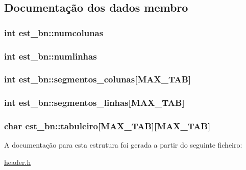 \subsection{Documentação dos dados membro}
\hypertarget{structest__bn_a0955bffd5d0a13407e1bb2657c296a24}{
\subsubsection[{numcolunas}]{\setlength{\rightskip}{0pt plus 5cm}int est\-\_\-bn\-::numcolunas}}\label{structest__bn_a0955bffd5d0a13407e1bb2657c296a24}
\hypertarget{structest__bn_af15be3a2b8dd97b2f754471aa655dc6f}{
\subsubsection[{numlinhas}]{\setlength{\rightskip}{0pt plus 5cm}int est\-\_\-bn\-::numlinhas}}\label{structest__bn_af15be3a2b8dd97b2f754471aa655dc6f}
\hypertarget{structest__bn_a265ad1c59b326360f2f973a120f21327}{
\subsubsection[{segmentos\-\_\-colunas}]{\setlength{\rightskip}{0pt plus 5cm}int est\-\_\-bn\-::segmentos\-\_\-colunas\mbox{[}{\bf M\-A\-X\-\_\-\-T\-A\-B}\mbox{]}}}\label{structest__bn_a265ad1c59b326360f2f973a120f21327}
\hypertarget{structest__bn_a08d8030c339bf47ead4990d55b03be3f}{
\subsubsection[{segmentos\-\_\-linhas}]{\setlength{\rightskip}{0pt plus 5cm}int est\-\_\-bn\-::segmentos\-\_\-linhas\mbox{[}{\bf M\-A\-X\-\_\-\-T\-A\-B}\mbox{]}}}\label{structest__bn_a08d8030c339bf47ead4990d55b03be3f}
\hypertarget{structest__bn_a99b2239f6adcd4c4e268639bb1041d5a}{
\subsubsection[{tabuleiro}]{\setlength{\rightskip}{0pt plus 5cm}char est\-\_\-bn\-::tabuleiro\mbox{[}{\bf M\-A\-X\-\_\-\-T\-A\-B}\mbox{]}\mbox{[}{\bf M\-A\-X\-\_\-\-T\-A\-B}\mbox{]}}}\label{structest__bn_a99b2239f6adcd4c4e268639bb1041d5a}


A documentação para esta estrutura foi gerada a partir do seguinte ficheiro\-:\begin{DoxyCompactItemize}
\item 
\hyperlink{header_8h}{header.\-h}\end{DoxyCompactItemize}
